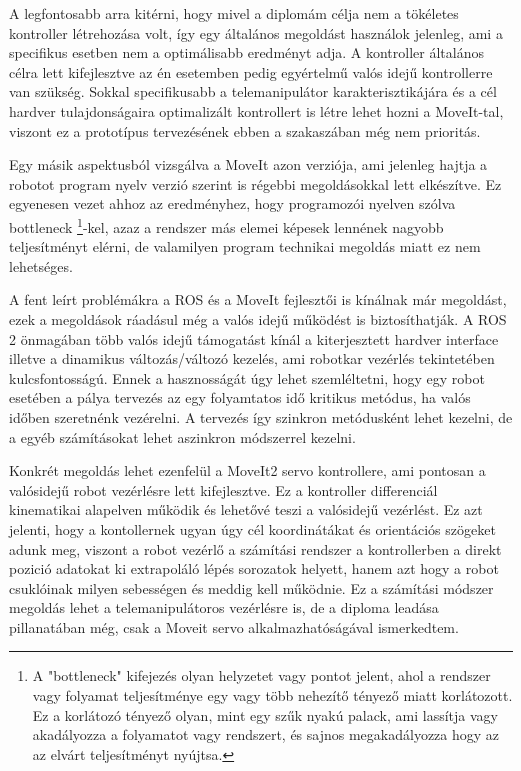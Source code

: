 A legfontosabb arra kitérni, hogy mivel a diplomám célja nem a tökéletes kontroller létrehozása volt, így egy általános megoldást használok jelenleg, ami a specifikus esetben nem a optimálisabb eredményt adja. A kontroller általános célra lett kifejlesztve az én esetemben pedig egyértelmű valós idejű kontrollerre van szükség. Sokkal specifikusabb a telemanipulátor karakterisztikájára és a cél hardver tulajdonságaira optimalizált kontrollert is létre lehet hozni a MoveIt-tal, viszont ez a prototípus tervezésének ebben a szakaszában még nem prioritás.\cite{ROSnoetic}

Egy másik aspektusból vizsgálva a MoveIt azon verziója, ami jelenleg hajtja a robotot program nyelv verzió szerint is régebbi megoldásokkal lett elkészítve. Ez egyenesen vezet ahhoz az eredményhez, hogy programozói nyelven szólva bottleneck \footnote{A "bottleneck" kifejezés olyan helyzetet vagy pontot jelent, ahol a rendszer vagy folyamat teljesítménye egy vagy több nehezítő tényező miatt korlátozott. Ez a korlátozó tényező olyan, mint egy szűk nyakú palack, ami lassítja vagy akadályozza a folyamatot vagy rendszert, és sajnos megakadályozza hogy az az elvárt teljesítményt nyújtsa.}-kel, azaz a rendszer más elemei képesek lennének nagyobb teljesítményt elérni, de valamilyen program technikai megoldás miatt ez nem lehetséges.\cite{ROSnoetic}\citep{moveit}

A fent leírt problémákra a ROS és a MoveIt fejlesztői is kínálnak már megoldást, ezek a megoldások ráadásul még a valós idejű működést is biztosíthatják. A ROS 2 önmagában több valós idejű támogatást kínál a kiterjesztett hardver interface illetve a dinamikus változás/változó kezelés, ami robotkar vezérlés tekintetében kulcsfontosságú. Ennek a hasznosságát úgy lehet szemléltetni, hogy egy robot esetében a pálya tervezés az egy folyamtatos idő kritikus metódus, ha valós időben szeretnénk vezérelni. A tervezés így szinkron metódusként lehet kezelni, de a egyéb számításokat lehet aszinkron módszerrel kezelni.\cite{ROSnoetic}\citep{moveit}

Konkrét megoldás lehet ezenfelül a MoveIt2 servo kontrollere, ami pontosan a valósidejű robot vezérlésre lett kifejlesztve. Ez a kontroller differenciál kinematikai alapelven működik és lehetővé teszi a valósidejű vezérlést. Ez azt jelenti, hogy a kontollernek ugyan úgy cél koordinátákat és orientációs szögeket adunk meg, viszont a robot vezérlő a számítási rendszer a kontrollerben a direkt pozició adatokat ki extrapoláló lépés sorozatok helyett, hanem azt hogy a robot csuklóinak milyen sebességen és meddig kell működnie. Ez a számítási módszer megoldás lehet a telemanipulátoros vezérlésre is, de a diploma leadása pillanatában még, csak a Moveit servo alkalmazhatóságával ismerkedtem.\cite{ROSnoetic}\citep{moveit}


